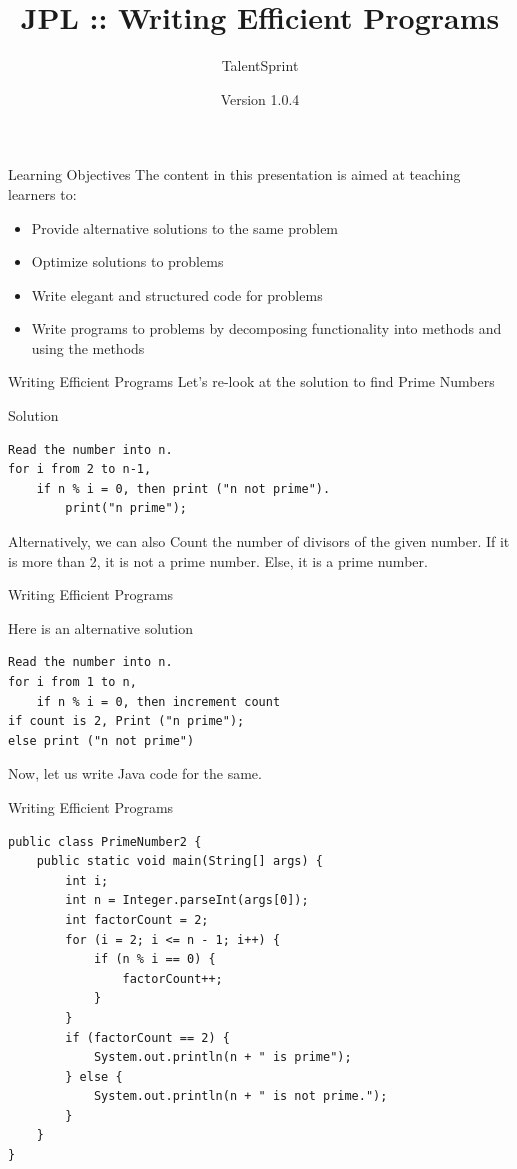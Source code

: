 \documentclass[14pt]{beamer}
\title[JPL:Java:02]{JPL :: Writing Efficient Programs}
\author[TS]{TalentSprint}
\institute[L\&D]{Licensed To Skill}
\date{Version 1.0.4}
\begin{document}
\begin{frame}
  \titlepage
\end{frame}

\begin{frame}{Learning Objectives}
The content in this presentation is aimed at teaching  learners to:
  \begin{itemize}
  \item Provide alternative solutions to the same problem
  \item Optimize solutions to problems
  \item Write elegant and structured code for problems
  \item Write programs to problems by decomposing functionality into methods and using the methods
  \end{itemize}
\end{frame}

\begin{frame}[fragile]{Writing Efficient Programs}
Let's re-look at the solution to find Prime Numbers
\begin{block}{Solution}
 \begin{lstlisting}[numbers=none]
Read the number into n.
for i from 2 to n-1, 
    if n % i = 0, then print ("n not prime").
        print("n prime");
 \end{lstlisting}
\end{block}
Alternatively, we can also Count the number of divisors of the given number. If it is more than 2, it is not a prime number. Else, it is a prime number.
\end{frame}

\begin{frame}[fragile]{Writing Efficient Programs}
  \begin{block}{Here is an alternative solution}
  \begin{lstlisting}[numbers=none]
Read the number into n.
for i from 1 to n, 
    if n % i = 0, then increment count
if count is 2, Print ("n prime");
else print ("n not prime")
  \end{lstlisting}

 \end{block}
Now, let us write Java code for the same. 
\end{frame}

\begin{frame}[fragile]{Writing Efficient Programs}
 \begin{lstlisting}
public class PrimeNumber2 {
    public static void main(String[] args) {
        int i;
        int n = Integer.parseInt(args[0]);
        int factorCount = 2;
        for (i = 2; i <= n - 1; i++) {
            if (n % i == 0) {
                factorCount++;
            }
        }
        if (factorCount == 2) {
            System.out.println(n + " is prime");
        } else {
            System.out.println(n + " is not prime.");
        }
    }
}
\end{lstlisting}
\end{frame}
\end{document}
